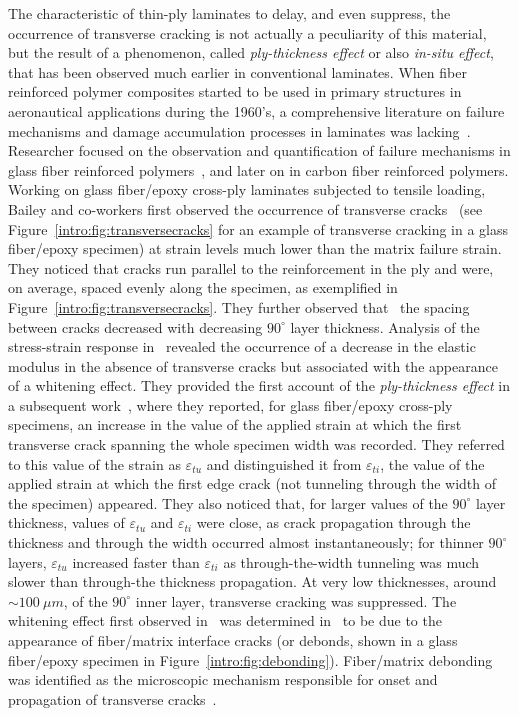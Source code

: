 The characteristic of thin-ply laminates to delay, and even suppress, the occurrence of transverse cracking is not actually a peculiarity of this material, but the result of a phenomenon, called \emph{ply-thickness effect} or also \emph{in-situ effect}, that has been observed much earlier in conventional laminates. When fiber reinforced polymer composites started to be used in primary structures in aeronautical applications during the 1960's, a comprehensive literature on failure mechanisms and damage accumulation processes in laminates was lacking~\cite{Hofer1967}. Researcher focused on the observation and quantification of failure mechanisms in glass fiber reinforced polymers~\cite{Hofer1967,Howe1972,Owen1972}, and later on in carbon fiber reinforced polymers. Working on glass fiber/epoxy cross-ply laminates subjected to tensile loading, Bailey and co-workers first observed the occurrence of transverse cracks~\cite{Garrett1977} (see Figure~\ref{intro:fig:transversecracks} for an example of transverse cracking in a glass fiber/epoxy specimen) at strain levels much lower than the matrix failure strain. They noticed that cracks run parallel to the reinforcement in the ply and were, on average, spaced evenly along the specimen, as exemplified in Figure~\ref{intro:fig:transversecracks}. They further observed that~\cite{Garrett1977,Parvizi1978a} the spacing between cracks decreased with decreasing $90^{\circ}$ layer thickness. Analysis of the stress-strain response in~\cite{Parvizi1978a} revealed the occurrence of a decrease in the elastic modulus in the absence of transverse cracks but associated with the appearance of a whitening effect. They provided the first account of the \emph{ply-thickness effect} in a subsequent work~\cite{Parvizi1978b}, where they reported, for glass fiber/epoxy cross-ply specimens, an increase in the value of the applied strain at which the first transverse crack spanning the whole specimen width was recorded. They referred to this value of the strain as $\varepsilon_{tu}$ and distinguished it from $\varepsilon_{ti}$, the value of the applied strain at which the first edge crack (not tunneling through the width of the specimen) appeared. They also noticed that, for larger values of the $90^{\circ}$ layer thickness, values of $\varepsilon_{tu}$ and $\varepsilon_{ti}$ were close, as crack propagation through the thickness and through the width occurred almost instantaneously; for thinner $90^{\circ}$ layers, $\varepsilon_{tu}$ increased faster than $\varepsilon_{ti}$ as through-the-width tunneling was much slower than through-the thickness propagation. At very low thicknesses, around $\sim100\ \mu m$, of the $90^{\circ}$ inner layer, transverse cracking was suppressed. The whitening effect first observed in~\cite{Parvizi1978a} was determined in~\cite{Bailey1979,Bailey1981} to be due to the appearance of fiber/matrix interface cracks (or debonds, shown in a glass fiber/epoxy specimen in Figure~\ref{intro:fig:debonding}). Fiber/matrix debonding was identified as the microscopic mechanism responsible for onset and propagation of transverse cracks~\cite{Bailey1979}.

